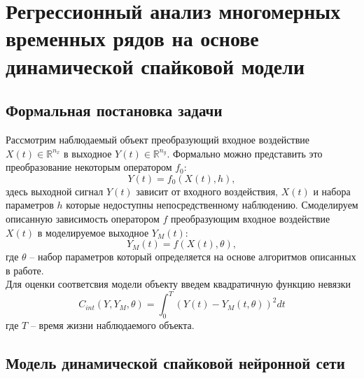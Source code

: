
\chapter{Регрессионный анализ многомерных временных рядов на основе динамической спайковой модели} \label{chapt2}

\section{Формальная постановка задачи} \label{sect2_1}
\indent Рассмотрим наблюдаемый объект преобразующий входное воздействие $X(t) \in \mathbb{R}^{n_{x}}$ в выходное $Y(t) \in \mathbb{R}^{n_{y}}$. Формально можно представить это преобразование некоторым оператором $f_{0}$:
\begin{equation}
Y(t) = f_{0}(X(t), h),
\end{equation}
здесь выходной сигнал $Y(t)$ зависит от входного воздействия, $X(t)$ и набора параметров $h$ которые недоступны непосредственному наблюдению.
\indent Смоделируем описанную зависимость оператором $f$ преобразующим входное воздействие $X(t)$ в моделируемое выходное $Y_{M}(t)$:
\begin{equation}
Y_{M}(t) = f(X(t), \theta),
\end{equation}
где $\theta$ -- набор параметров который определяется на основе алгоритмов описанных в работе.\\
\indent Для оценки соответсвия модели объекту введем квадратичную функцию невязки 
\begin{equation} \label{eq:p2_1_cost}
C_{int}(Y, Y_{M}, \theta) = \int_{0}^{T} (Y(t) - Y_{M}(t, \theta))^2 dt 
\end{equation}
где $T$ -- время жизни наблюдаемого объекта.

\section{Модель динамической спайковой нейронной сети} \label{sect2_2}
